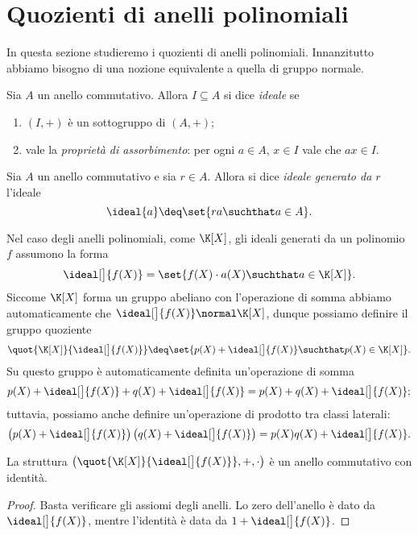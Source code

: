 \section{Quozienti di anelli polinomiali}

In questa sezione studieremo i quozienti di anelli polinomiali. Innanzitutto abbiamo bisogno di una nozione equivalente a quella di gruppo normale.

\begin{definition}
    [Ideale] Sia $A$ un anello commutativo. Allora $I \subseteq A$ si dice \emph{ideale} se \begin{enumerate}
        \item $(I, +)$ è un sottogruppo di $(A, +)$;
        \item vale la \emph{proprietà di assorbimento}: per ogni $a \in A$, $x \in I$ vale che $ax \in I$.
    \end{enumerate}
\end{definition}

\begin{definition}
    Sia $A$ un anello commutativo e sia $r \in A$. Allora si dice \emph{ideale generato da $r$} l'ideale \[
        \ideal{a} \deq \set{ra \suchthat a \in A}.    
    \]
\end{definition}

Nel caso degli anelli polinomiali, come $\K[X]$, gli ideali generati da un polinomio $f$ assumono la forma \[
    \ideal[\big]{f(X)} = \set{f(X)\cdot a(X) \suchthat a \in \K[X]}.    
\] Siccome $\K[X]$ forma un gruppo abeliano con l'operazione di somma abbiamo automaticamente che $\ideal[\big]{f(X)} \normal \K[X]$, dunque possiamo definire il gruppo quoziente \[
    \quot{\K[X]}{\ideal[\big]{f(X)}} \deq \set{p(X) + \ideal[\big]{f(X)} \suchthat p(X) \in \K[X]}.
\] Su questo gruppo è automaticamente definita un'operazione di somma \[
    p(X) + \ideal[\big]{f(X)} + q(X) + \ideal[\big]{f(X)} = p(X) + q(X) + \ideal[\big]{f(X)};
\] tuttavia, possiamo anche definire un'operazione di prodotto tra classi laterali: \[
    \left( p(X) + \ideal[\big]{f(X)} \right)\left( q(X) + \ideal[\big]{f(X)} \right) = p(X)q(X) + \ideal[\big]{f(X)}.
\] 

\begin{theorem}
    La struttura $\left( \quot{\K[X]}{\ideal[\big]{f(X)}}, +, \cdot \right)$ è un anello commutativo con identità.
\end{theorem}
\begin{proof}
    Basta verificare gli assiomi degli anelli. Lo zero dell'anello è dato da $\ideal[\big]{f(X)}$, mentre l'identità è data da $1 + \ideal[\big]{f(X)}$.
\end{proof}

